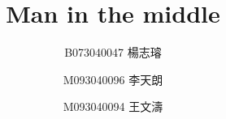 \documentclass[a4paper]{article}
\title{\textbf{Man in the middle}}
\author{B073040047 楊志璿 \and M093040096 李天朗 \and M093040094 王文濤}
\begin{document}
\begin{CJK*}{UTF8}{bsmi}
    \maketitle
    \newpage


\end{CJK*}
\end{document}
